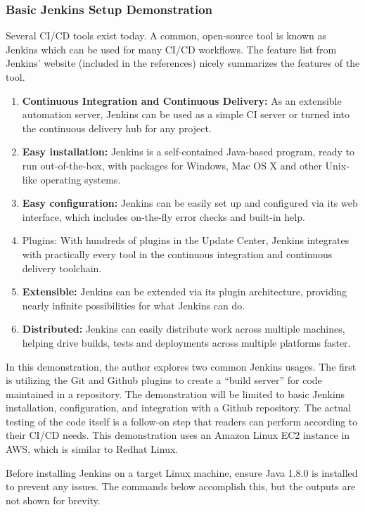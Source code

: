 \subsubsection{Basic Jenkins Setup Demonstration}
Several CI/CD tools exist today. A common, open-source tool is known as
Jenkins which can be used for many CI/CD workflows. The feature list from
Jenkins’ website (included in the references) nicely summarizes the features
of the tool.

\begin{enumerate}
  \item \textbf{Continuous Integration and Continuous Delivery:} As an
  extensible automation server, Jenkins can be used as a simple CI server or
  turned into the continuous delivery hub for any project.
  \item \textbf{Easy installation:} Jenkins is a self-contained Java-based
  program, ready to run out-of-the-box, with packages for Windows, Mac OS X
  and other Unix-like operating systems.
  \item \textbf{Easy configuration:} Jenkins can be easily set up and
  configured via its web interface, which includes on-the-fly error checks and
  built-in help.  \item Plugins: With hundreds of plugins in the Update
  Center, Jenkins integrates with practically every tool in the continuous
  integration and continuous delivery toolchain.
  \item \textbf{Extensible:} Jenkins can be extended via its plugin
  architecture, providing nearly infinite possibilities for what Jenkins can do.
  \item \textbf{Distributed:} Jenkins can easily distribute work across
  multiple machines, helping drive builds, tests and deployments across
  multiple platforms faster.
\end{enumerate}

In this demonstration, the author explores two common Jenkins usages. The
first is utilizing the Git and Github plugins to create a ``build server'' for
code maintained in a repository. The demonstration will be limited to basic
Jenkins installation, configuration, and integration with a Github repository.
The actual testing of the code itself is a follow-on step that readers can
perform according to their CI/CD needs. This demonstration uses an Amazon
Linux EC2 instance in AWS, which is similar to Redhat Linux.

Before installing Jenkins on a target Linux machine, ensure Java 1.8.0 is
installed to prevent any issues. The commands below accomplish this, but the
outputs are not shown for brevity.

